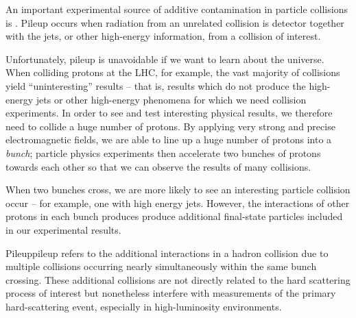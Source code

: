 \begin{subappendices}
An important experimental source of additive contamination in particle collisions is .
%
Pileup occurs when radiation from an unrelated collision is detector together with the jets, or other high-energy information, from a collision of interest.

Unfortunately, pileup is unavoidable if we want to learn about the universe.
%
When colliding protons at the LHC, for example, the vast majority of collisions yield ``uninteresting'' results -- that is, results which do not produce the high-energy jets or other high-energy phenomena for which we need collision experiments.
%
In order to see and test interesting physical results, we therefore need to collide a huge number of protons.
%
By applying very strong and precise electromagnetic fields, we are able to line up a huge number of protons into a \textit{bunch};
%
particle physics experiments then accelerate two bunches of protons towards each other so that we can observe the results of many collisions.

When two bunches cross, we are more likely to see an interesting particle collision occur -- for example, one with high energy jets.
%
However, the interactions of other protons in each bunch produces produce additional final-state particles included in our experimental results.


\begin{definitionbox}{Pileup}{pileup}
     refers to the additional interactions in a hadron collision due to multiple collisions occurring nearly simultaneously within the same bunch crossing.
    These additional collisions are not directly related to the hard scattering process of interest but nonetheless interfere with measurements of the primary hard-scattering event, especially in high-luminosity environments.
\end{definitionbox}



\end{subappendices}

